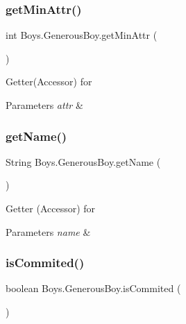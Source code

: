\subsubsection{\texorpdfstring{get\+Min\+Attr()}{getMinAttr()}}
{\footnotesize\ttfamily int Boys.\+Generous\+Boy.\+get\+Min\+Attr (\begin{DoxyParamCaption}{ }\end{DoxyParamCaption})\hspace{0.3cm}{\ttfamily [inline]}}

Getter(\+Accessor) for 
\begin{DoxyParams}{Parameters}
{\em attr} & \\
\hline
\end{DoxyParams}
\mbox{\label{class_boys_1_1_generous_boy_a8771ae1537a1068542a41c41ff88620d}} 
\subsubsection{\texorpdfstring{get\+Name()}{getName()}}
{\footnotesize\ttfamily String Boys.\+Generous\+Boy.\+get\+Name (\begin{DoxyParamCaption}{ }\end{DoxyParamCaption})\hspace{0.3cm}{\ttfamily [inline]}}

Getter (Accessor) for 
\begin{DoxyParams}{Parameters}
{\em name} & \\
\hline
\end{DoxyParams}
\mbox{\label{class_boys_1_1_generous_boy_a11fc6528df408da8d197595bbb3ff7d9}} 
\subsubsection{\texorpdfstring{is\+Commited()}{isCommited()}}
{\footnotesize\ttfamily boolean Boys.\+Generous\+Boy.\+is\+Commited (\begin{DoxyParamCaption}{ }\end{DoxyParamCaption})\hspace{0.3cm}{\ttfamily [inline]}}

